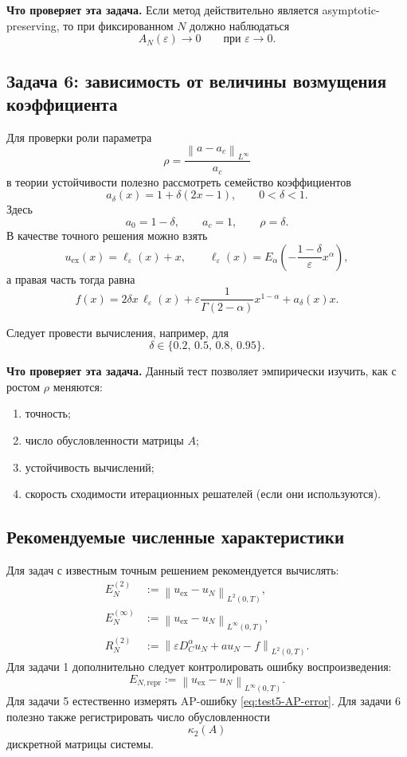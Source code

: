 \documentclass[12pt,a4paper]{article}
\theoremstyle{definition}
\newcommand{\eps}{\varepsilon}
\newcommand{\Dc}{D_C^\alpha}
\newcommand{\norm}[1]{\left\lVert #1 \right\rVert}
\begin{document}
\medskip
\noindent
\textbf{Что проверяет эта задача.}
Если метод действительно является asymptotic-preserving, то при фиксированном $N$
должно наблюдаться
\[
A_N(\eps)\to 0 \qquad \text{при } \eps\to0.
\]

\subsection{Задача 6: зависимость от величины возмущения коэффициента}

Для проверки роли параметра
\[
\rho=\frac{\norm{a-a_c}_{L^\infty}}{a_c}
\]
в теории устойчивости полезно рассмотреть семейство коэффициентов
\[
a_\delta(x)=1+\delta(2x-1),
\qquad 0<\delta<1.
\]
Здесь
\[
a_0=1-\delta,
\qquad
a_c=1,
\qquad
\rho=\delta.
\]
В качестве точного решения можно взять
\begin{equation}
\label{eq:test6-uex}
u_{\mathrm{ex}}(x)=\ell_\eps(x)+x,
\qquad
\ell_\eps(x)=E_\alpha\!\left(-\frac{1-\delta}{\eps}x^\alpha\right),
\end{equation}
а правая часть тогда равна
\begin{equation}
\label{eq:test6-f}
f(x)
=
2\delta x\,\ell_\eps(x)
+
\eps \frac{1}{\Gamma(2-\alpha)}x^{1-\alpha}
+
a_\delta(x)x.
\end{equation}

Следует провести вычисления, например, для
\[
\delta\in\{0.2,\,0.5,\,0.8,\,0.95\}.
\]

\medskip
\noindent
\textbf{Что проверяет эта задача.}
Данный тест позволяет эмпирически изучить, как с ростом $\rho$ меняются:
\begin{enumerate}[label=\textup{(\alph*)}]
\item точность;
\item число обусловленности матрицы $A$;
\item устойчивость вычислений;
\item скорость сходимости итерационных решателей (если они используются).
\end{enumerate}

\subsection{Рекомендуемые численные характеристики}

Для задач с известным точным решением рекомендуется вычислять:
\begin{align}
E_N^{(2)} &:= \norm{u_{\mathrm{ex}}-u_N}_{L^2(0,T)}, \\
E_N^{(\infty)} &:= \norm{u_{\mathrm{ex}}-u_N}_{L^\infty(0,T)}, \\
R_N^{(2)} &:= \norm{\eps \Dc u_N + a u_N - f}_{L^2(0,T)}.
\end{align}
Для задачи 1 дополнительно следует контролировать ошибку воспроизведения:
\[
E_{N,\mathrm{repr}}:=\norm{u_{\mathrm{ex}}-u_N}_{L^\infty(0,T)}.
\]
Для задачи 5 естественно измерять AP-ошибку \eqref{eq:test5-AP-error}.
Для задачи 6 полезно также регистрировать число обусловленности
\[
\kappa_2(A)
\]
дискретной матрицы системы.
\end{document}
